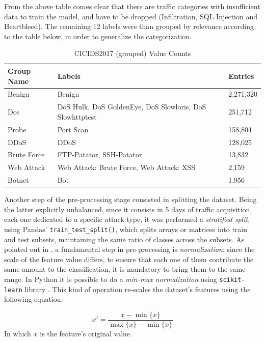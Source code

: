 \noindent From the above table comes clear that there are traffic categories with insufficient data to train the model, and have to be dropped (Infiltration, SQL Injection and Heartbleed). The remaining 12 labels were than grouped by relevance according to the table below, in order to generalize the categorization.

\begin{table}[h!]
    \centering
    \begin{tabular}{l|l|l}
        \toprule 
        Group Name & Labels & Entries \\
        \midrule
        \rowcolor{black!10} Benign & Benign & 2,271,320 \\
        Dos & DoS Hulk, DoS GoldenEye, DoS Slowloris, DoS Slowhttptest &  251,712 \\
        \rowcolor{black!10}Probe & Port Scan & 158,804 \\
        DDoS & DDoS & 128,025 \\
        \rowcolor{black!10}Brute Force & FTP-Patator, SSH-Patator  & 13,832 \\
        Web Attack & Web Attack: Brute Force, Web Attack: XSS & 2,159 \\
        \rowcolor{black!10}Botnet & Bot & 1,956 \\
        \bottomrule
    \end{tabular}
    \caption{CICIDS2017 (grouped) Value Counts}
    \label{tab:grouped-dataset-distribution}
\end{table}

\noindent Another step of the pre-processing stage consisted in splitting the dataset. Being the latter explicitly unbalanced, since it consists in 5 days of traffic acquisition, each one dedicated to a specific attack type, it was performed a \textit{stratified split}, using Pandas' \texttt{train\_test\_split()}, which splits arrays or matrices into train and test subsets, maintaining the same ratio of classes across the subsets. As pointed out in \cite{Mozley2020}, a fundamental step in pre-processing is \textit{normalization}: since the scale of the feature value differs, to ensure that each one of them contribute the same amount to the classification, it is mandatory to bring them to the same range. In Python it is possible to do a \textit{min-max normalization} using \texttt{scikit-learn} library \cite{ScikitWebsite}. This kind of operation re-scales the dataset's features using the following equation:

\begin{equation}
    x\prime=\frac{x-\min\{x\}}{\max\{x\}-\min\{x\}}
\end{equation}
In which $x$ is the feature's original value.

